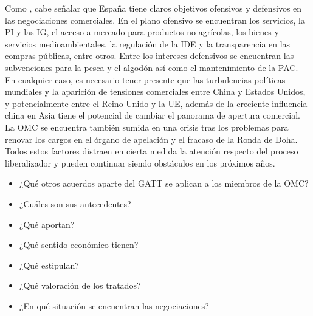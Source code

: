 \documentclass{nuevotema}
\begin{document}
Como , cabe señalar que España tiene claros objetivos ofensivos y defensivos en las negociaciones comerciales. En el plano ofensivo se encuentran los servicios, la PI y las IG, el acceso a mercado para productos no agrícolas, los bienes y servicios medioambientales, la regulación de la IDE y la transparencia en las compras públicas, entre otros. Entre los intereses defensivos se encuentran las subvenciones para la pesca y el algodón así como el mantenimiento de la PAC. En cualquier caso, es necesario tener presente que las turbulencias políticas mundiales y la aparición de tensiones comerciales entre China y Estados Unidos, y potencialmente entre el Reino Unido y la UE, además de la creciente influencia china en Asia tiene el potencial de cambiar el panorama de apertura comercial. La OMC se encuentra también sumida en una crisis tras los problemas para renovar los cargos en el órgano de apelación y el fracaso de la Ronda de Doha. Todos estos factores distraen en cierta medida la atención respecto del proceso liberalizador y pueden continuar siendo obstáculos en los próximos años.



\begin{itemize}
	\item ¿Qué otros acuerdos aparte del GATT se aplican a los miembros de la OMC?
	\item ¿Cuáles son sus antecedentes?
	\item ¿Qué aportan?
	\item ¿Qué sentido económico tienen?
	\item ¿Qué estipulan?
	\item ¿Qué valoración de los tratados?
	\item ¿En qué situación se encuentran las negociaciones?
\end{itemize}

\esquemacorto
\end{document}
